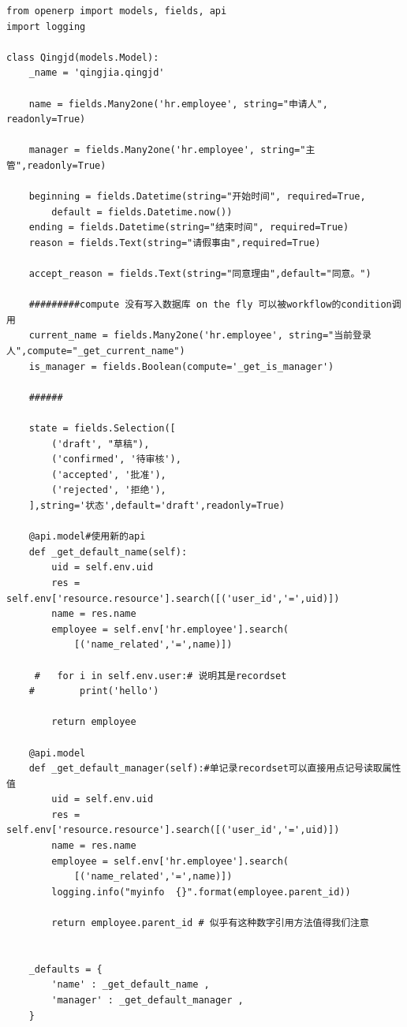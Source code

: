 \documentclass[11pt,a4paper]{sphinxmanual}
\begin{document}
\begin{verbatim}
from openerp import models, fields, api
import logging

class Qingjd(models.Model):
    _name = 'qingjia.qingjd'

    name = fields.Many2one('hr.employee', string="申请人", readonly=True)

    manager = fields.Many2one('hr.employee', string="主管",readonly=True)

    beginning = fields.Datetime(string="开始时间", required=True,
        default = fields.Datetime.now())
    ending = fields.Datetime(string="结束时间", required=True)
    reason = fields.Text(string="请假事由",required=True)

    accept_reason = fields.Text(string="同意理由",default="同意。")

    #########compute 没有写入数据库 on the fly 可以被workflow的condition调用
    current_name = fields.Many2one('hr.employee', string="当前登录人",compute="_get_current_name")
    is_manager = fields.Boolean(compute='_get_is_manager')

    ######

    state = fields.Selection([
        ('draft', "草稿"),
        ('confirmed', '待审核'),
        ('accepted', '批准'),
        ('rejected', '拒绝'),
    ],string='状态',default='draft',readonly=True)

    @api.model#使用新的api
    def _get_default_name(self):
        uid = self.env.uid
        res = self.env['resource.resource'].search([('user_id','=',uid)])
        name = res.name
        employee = self.env['hr.employee'].search(
            [('name_related','=',name)])

     #   for i in self.env.user:# 说明其是recordset
    #        print('hello')

        return employee

    @api.model
    def _get_default_manager(self):#单记录recordset可以直接用点记号读取属性值
        uid = self.env.uid
        res = self.env['resource.resource'].search([('user_id','=',uid)])
        name = res.name
        employee = self.env['hr.employee'].search(
            [('name_related','=',name)])
        logging.info("myinfo  {}".format(employee.parent_id))

        return employee.parent_id # 似乎有这种数字引用方法值得我们注意


    _defaults = {
        'name' : _get_default_name ,
        'manager' : _get_default_manager ,
    }


\end{verbatim}
\end{document}
